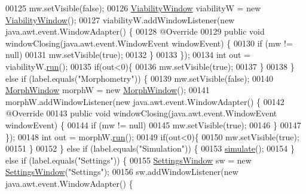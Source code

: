 \begin{DoxyCode}
00125           mw.setVisible(\textcolor{keyword}{false});
00126           \hyperlink{classgui_1_1_viability_window}{ViabilityWindow} viabilityW = \textcolor{keyword}{new} \hyperlink{classgui_1_1_viability_window}{ViabilityWindow}();
00127           viabilityW.addWindowListener(\textcolor{keyword}{new} java.awt.event.WindowAdapter() \{
00128             @Override
00129             \textcolor{keyword}{public} \textcolor{keywordtype}{void} windowClosing(java.awt.event.WindowEvent windowEvent) \{
00130               \textcolor{keywordflow}{if} (mw != null)
00131                 mw.setVisible(\textcolor{keyword}{true});
00132             \}
00133           \});
00134           \textcolor{keywordtype}{int} out = viabilityW.\hyperlink{classgui_1_1_image_analysis_window_a58e8be2db2660128e4e6456a9c981fb5}{run}();
00135           \textcolor{keywordflow}{if}(out<0)\{
00136             mw.setVisible(\textcolor{keyword}{true});
00137           \}
00138         \} \textcolor{keywordflow}{else} \textcolor{keywordflow}{if} (label.equals(\textcolor{stringliteral}{"Morphometry"})) \{
00139           mw.setVisible(\textcolor{keyword}{false});
00140           \hyperlink{classgui_1_1_morph_window}{MorphWindow} morphW = \textcolor{keyword}{new} \hyperlink{classgui_1_1_morph_window}{MorphWindow}();
00141           morphW.addWindowListener(\textcolor{keyword}{new} java.awt.event.WindowAdapter() \{
00142             @Override
00143             \textcolor{keyword}{public} \textcolor{keywordtype}{void} windowClosing(java.awt.event.WindowEvent windowEvent) \{
00144               \textcolor{keywordflow}{if} (mw != null)
00145                 mw.setVisible(\textcolor{keyword}{true});
00146             \}
00147           \});
00148           \textcolor{keywordtype}{int} out = morphW.\hyperlink{classgui_1_1_image_analysis_window_a58e8be2db2660128e4e6456a9c981fb5}{run}();
00149           \textcolor{keywordflow}{if}(out<0)\{
00150             mw.setVisible(\textcolor{keyword}{true});
00151           \}
00152         \} \textcolor{keywordflow}{else} \textcolor{keywordflow}{if} (label.equals(\textcolor{stringliteral}{"Simulation"})) \{
00153           \hyperlink{classgui_1_1_main_window_a1f451daf160cbacfab1e7b495789750e}{simulate}();
00154         \} \textcolor{keywordflow}{else} \textcolor{keywordflow}{if} (label.equals(\textcolor{stringliteral}{"Settings"})) \{
00155           \hyperlink{classgui_1_1_settings_window}{SettingsWindow} sw = \textcolor{keyword}{new} \hyperlink{classgui_1_1_settings_window}{SettingsWindow}(\textcolor{stringliteral}{"Settings"});
00156           sw.addWindowListener(\textcolor{keyword}{new} java.awt.event.WindowAdapter() \{

\end{DoxyCode}
